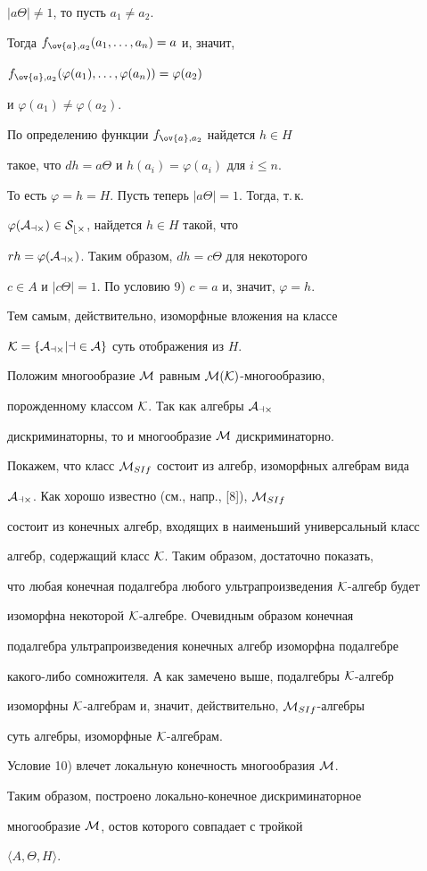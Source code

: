 \begin{pf}
$|a\Theta|\neq 1$, то пусть $a_1\neq a_2$.


Тогда $f_{\ov{a},a_2}(a_1,\dotsc,a_n)=a$ и, значит,


$f_{\ov{a},a_2}(\varphi(a_1),\dotsc,\varphi(a_n))=\varphi(a_2)$


и $\varphi(a_1)\ne\varphi(a_2)$.


По определению функции $f_{\ov{a},a_2}$ найдется $h\in H$


такое, что $dh=a\Theta$ и $h(a_i)=\varphi(a_i)$ для $i\leq n$.


То есть $\varphi=h=H$. Пусть теперь $|a\Theta|=1$. Тогда, т.\,к.


$\varphi(\cal A_{a\Theta})\in S_{b\Theta}$, найдется $h\in H$ такой, что


$rh=\varphi(\cal A_{a\Theta})$. Таким образом, $dh=c\Theta$ для некоторого


$c\in A$ и $|c\Theta|=1$. По условию 9)\; $c=a$ и, значит, $\varphi=h$.


Тем самым, действительно, изоморфные вложения на классе


$\cal K=\{\cal A_{a\Theta}|a\in A\}$ суть отображения из $H$.





Положим многообразие ${\cal M}$ равным ${\cal M}(\cal K)$-многообразию,


порожденному классом $\cal K$. Так как алгебры $\cal A_{a\Theta}$


дискриминаторны, то и многообразие ${\cal M}$ дискриминаторно.


Покажем, что класс ${\cal M}_{SIf}$ состоит из алгебр, изоморфных алгебрам вида


$\cal A_{a\Theta}$. Как хорошо известно (см., напр., [8]), ${\cal M}_{SIf}$


состоит из конечных алгебр, входящих в наименьший универсальный класс


алгебр, содержащий класс $\cal K$. Таким образом, достаточно показать,


что любая конечная подалгебра любого ультрапроизведения $\cal K$-алгебр будет


изоморфна некоторой $\cal K$-алгебре. Очевидным образом конечная


подалгебра ультрапроизведения конечных алгебр изоморфна подалгебре


какого-либо сомножителя. А как замечено выше, подалгебры $\cal K$-алгебр


изоморфны $\cal K$-алгебрам и, значит, действительно, ${\cal M}_{SIf}$-алгебры


суть алгебры, изоморфные $\cal K$-алгебрам.





Условие 10) влечет локальную конечность многообразия ${\cal M}$.





Таким образом, построено локально-конечное дискриминаторное


многообразие ${\cal M}$, остов которого совпадает с тройкой


$\langle A,\Theta,H\rangle$.


\end{pf}





